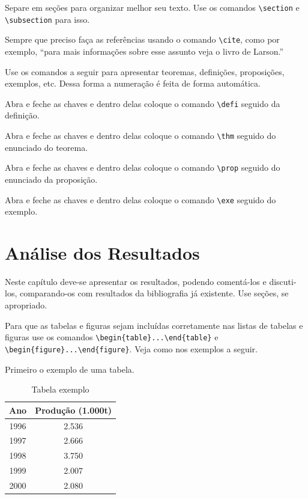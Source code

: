 \documentclass[12pt,a4paper,header]{abnt}
\begin{document}
Separe em seções para organizar melhor seu texto. Use os comandos \verb|\section| e \verb|\subsection| para isso. 

Sempre que preciso faça as referências usando o comando \verb|\cite|, como por exemplo, ``para mais informações sobre esse assunto veja o livro de Larson.''

Use os comandos a seguir para apresentar teoremas, definições, proposições, exemplos, etc. Dessa forma a numeração é feita de forma automática. 

{
Abra e feche as chaves e dentro delas coloque o comando \verb|\defi| seguido da definição. 
}

{\thm
Abra e feche as chaves e dentro delas coloque o comando \verb|\thm| seguido do enunciado do teorema. 
}

{\prop
Abra e feche as chaves e dentro delas coloque o comando \verb|\prop| seguido do enunciado da proposição.
}


{\exe
Abra e feche as chaves e dentro delas coloque o comando \verb|\exe| seguido do exemplo.
}




\chapter{Análise dos Resultados}


Neste capítulo deve-se apresentar os resultados, podendo comentá-los e discuti-los, comparando-os com resultados da bibliografia já existente. Use seções, se apropriado.

Para que as tabelas e figuras sejam incluídas corretamente nas listas de tabelas e figuras use os comandos 
\verb|\begin{table}...\end{table}| e \verb|\begin{figure}...\end{figure}|. Veja como nos exemplos a seguir.

Primeiro o exemplo de uma tabela. 

\begin{table}[h!]
\centering
\caption{Tabela exemplo} \label{fig:exemplo}
\begin{tabular}{cc}
\hline
Ano & Produção (1.000t)\\
\hline
1996 & 2.536\\
1997 & 2.666\\
1998 & 3.750\\
1999 & 2.007\\
2000 & 2.080\\
\hline
\end{tabular}
\end{table}
\end{document}
